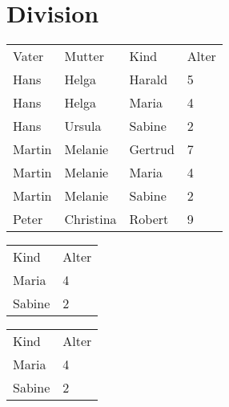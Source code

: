 \documentclass{lehramt-informatik-aufgabe}
\begin{document}
\section{Division
}


\begin{tabular}{llll}
Vater  & Mutter    & Kind    & Alter \\
Hans   & Helga     & Harald  & 5     \\
Hans   & Helga     & Maria   & 4     \\
Hans   & Ursula    & Sabine  & 2     \\
Martin & Melanie   & Gertrud & 7     \\
Martin & Melanie   & Maria   & 4     \\
Martin & Melanie   & Sabine  & 2     \\
Peter  & Christina & Robert  & 9
\end{tabular}


\begin{tabular}{ll}
Kind   & Alter \\
Maria  & 4     \\
Sabine & 2
\end{tabular}


\begin{tabular}{ll}
Kind   & Alter \\
Maria  & 4     \\
Sabine & 2
\end{tabular}
\end{document}
